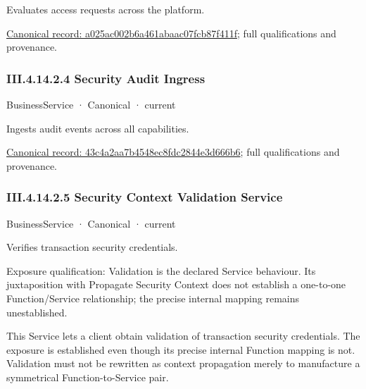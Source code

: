Evaluates access requests across the platform.


{\footnotesize \href{../../../../../../../../continuum/business/business-service/a025ac002b6a461abaac07fcb87f411f.md}{Canonical record: a025ac002b6a461abaac07fcb87f411f}; full qualifications and provenance.}\par
\subsubsection*{III.4.14.2.4 Security Audit Ingress}
\label{navigation:III.4.14.2.4}

\label{element:43c4a2aa7b4548ec8fdc2844e3d666b6}
{\small BusinessService · Canonical · current}\par

Ingests audit events across all capabilities.


{\footnotesize \href{../../../../../../../../continuum/business/business-service/43c4a2aa7b4548ec8fdc2844e3d666b6.md}{Canonical record: 43c4a2aa7b4548ec8fdc2844e3d666b6}; full qualifications and provenance.}\par
\subsubsection*{III.4.14.2.5 Security Context Validation Service}
\label{navigation:III.4.14.2.5}

\label{element:f1ff9e6542004a7584a385062cb0ed21}
{\small BusinessService · Canonical · current}\par

Verifies transaction security credentials.



Exposure qualification: Validation is the declared Service behaviour. Its juxtaposition with Propagate Security Context does not establish a one-to-one Function/Service relationship; the precise internal mapping remains unestablished.



This Service lets a client obtain validation of transaction security credentials. The exposure is established even though its precise internal Function mapping is not. Validation must not be rewritten as context propagation merely to manufacture a symmetrical Function-to-Service pair.


